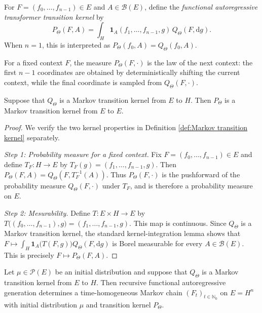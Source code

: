 \begin{definition}[]\label{def:FAT Markov transition kernel}
For \(F=(f_0,\ldots,f_{n-1})\in E\) and \(A\in\mathcal B(E)\), define the \emph{functional autoregressive transformer transition kernel} by
\[P_\Theta(F,A)=\int_H\mathbf 1_A(f_1,\ldots,f_{n-1},g)\,Q_\Theta(F,\mathrm dg).\]
When \(n=1\), this is interpreted as \(P_\Theta(f_0,A)=Q_\Theta(f_0,A)\).
\end{definition}

For a fixed context \(F\), the measure \(P_\Theta(F,\cdot)\) is the law of the next context: the first \(n-1\) coordinates are obtained by deterministically shifting the current context, while the final coordinate is sampled from \(Q_\Theta(F,\cdot)\).

\begin{proposition}\label{prop:Markov transition kernel}
Suppose that \(Q_\Theta\) is a Markov transition kernel from \(E\) to \(H\). Then \(P_\Theta\) is a Markov transition kernel from \(E\) to \(E\).
\end{proposition}

\begin{proof}
We verify the two kernel properties in Definition \ref{def:Markov transition kernel} separately.

\textit{Step 1: Probability measure for a fixed context.}
Fix \(F=(f_0,\ldots,f_{n-1})\in E\) and define \(T_F:H\to E\) by
\(
T_F(g)=(f_1,\ldots,f_{n-1},g).
\)
Then \(P_\Theta(F,A)=Q_\Theta(F,T_F^{-1}(A))\). Thus \(P_\Theta(F,\cdot)\) is the pushforward of the probability measure \(Q_\Theta(F,\cdot)\) under \(T_F\), and is therefore a probability measure on \(E\).

\textit{Step 2: Mesurability.}
Define \(T:E\times H\to E\) by
\(
T\bigl((f_0,\ldots,f_{n-1}),g\bigr)
=(f_1,\ldots,f_{n-1},g).
\)
This map is continuous. Since \(Q_\Theta\) is a Markov transition kernel, the standard kernel-integration lemma \parencite[Lemma~3.2]{Kallenberg2021} shows that
\(
F\longmapsto\int_H\mathbf 1_A\bigl(T(F,g)\bigr)Q_\Theta(F,\mathrm dg)
\)
is Borel measurable for every \(A\in\mathcal B(E)\). This is precisely \(F\mapsto P_\Theta(F,A)\).
\end{proof}

\begin{theorem}\label{thm:Markov chain formulation}
Let \(\mu\in\mathcal P(E)\) be an initial distribution and suppose that \(Q_\Theta\) is a Markov transition kernel from \(E\) to \(H\). Then recursive functional autoregressive generation determines a time-homogeneous Markov chain \((F_t)_{t\in\mathbb N_0}\) on \(E=H^n\) with initial distribution \(\mu\) and transition kernel \(P_\Theta\).
\end{theorem}


